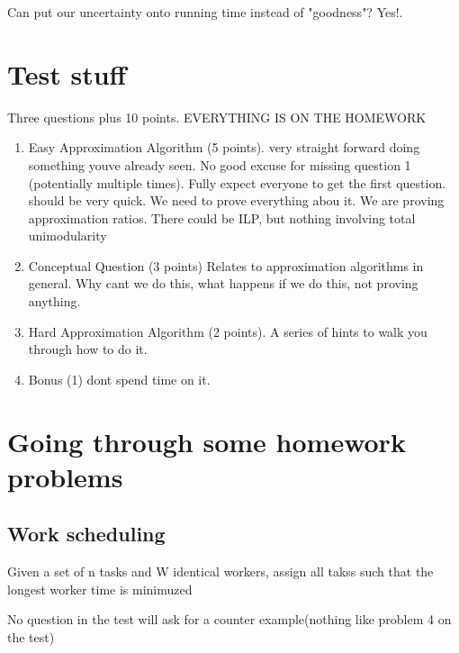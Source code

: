 \documentclass[11pt]{article}
\begin{document}
Can put our uncertainty onto running time instead of "goodness"? Yes!.


\section{Test stuff}
\label{sec:orgb128137}

Three questions plus 10 points. EVERYTHING IS ON THE HOMEWORK

\begin{enumerate}
\item Easy Approximation Algorithm (5 points).
very straight forward doing something youve already seen. No good excuse for missing question 1 (potentially multiple times). Fully expect everyone to get the first question. should be very quick. We need to prove everything abou it. We are proving approximation ratios. There could be ILP, but nothing involving total unimodularity
\item Conceptual Question (3 points)
Relates to approximation algorithms in general. Why cant we do this, what happens if we do this, not proving anything.
\item Hard Approximation Algorithm (2 points).
A series of hints to walk you through how to do it.
\item Bonus (1) dont spend time on it.
\end{enumerate}


\section{Going through some homework problems}
\label{sec:org24800c1}

\subsection{Work scheduling}
\label{sec:org3a95d44}

Given a set of n tasks and W identical workers, assign all takss such that the longest worker time is minimuzed

No question in the test will ask for a counter example(nothing like problem 4 on the test)
\end{document}
